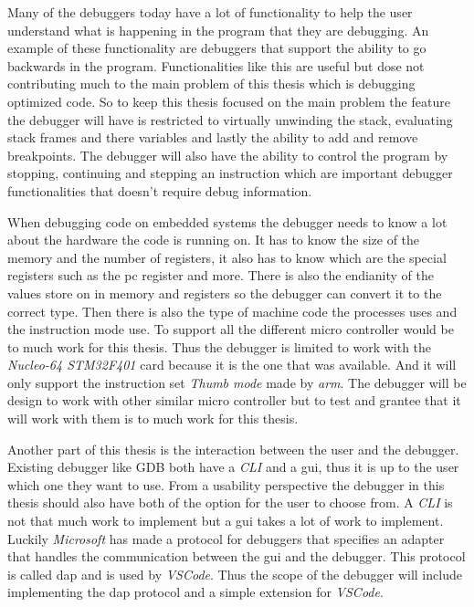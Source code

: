 Many of the debuggers today have a lot of functionality to help the user understand what is happening in the program that they are debugging.
An example of these functionality are debuggers that support the ability to go backwards in the program.
Functionalities like this are useful but dose not contributing much to the main problem of this thesis which is debugging optimized code.
So to keep this thesis focused on the main problem the feature the debugger will have is restricted to virtually unwinding the stack, evaluating stack frames and there variables and lastly the ability to add and remove breakpoints.
The debugger will also have the ability to control the program by stopping, continuing and stepping an instruction which are important debugger functionalities that doesn't require debug information.


When debugging code on embedded systems the debugger needs to know a lot about the hardware the code is running on.
It has to know the size of the memory and the number of registers, it also has to know which are the special registers such as the \gls{pc} register and more.
There is also the endianity of the values store on in memory and registers so the debugger can convert it to the correct type.
Then there is also the type of machine code the processes uses and the instruction mode use.
To support all the different micro controller would be to much work for this thesis.
Thus the debugger is limited to work with the \emph{Nucleo-64 STM32F401} card because it is the one that was available.
And it will only support the instruction set \emph{Thumb mode} made by \emph{arm}.
The debugger will be design to work with other similar micro controller but to test and grantee that it will work with them is to much work for this thesis.


Another part of this thesis is the interaction between the user and the debugger.
Existing debugger like \gls{GDB} both have a \emph{CLI} and a \acrfull{gui}, thus it is up to the user which one they want to use.
From a usability perspective the debugger in this thesis should also have both of the option for the user to choose from.
A \emph{CLI} is not that much work to implement but a \acrshort{gui} takes a lot of work to implement.
Luckily \emph{Microsoft} has made a protocol for debuggers that specifies an adapter that handles the communication between the \acrshort{gui} and the debugger.
This protocol is called \acrfull{dap}\cite{dap} and is used by \emph{VSCode}.
Thus the scope of the debugger will include implementing the \acrshort{dap} protocol and a simple extension for \emph{VSCode}.


